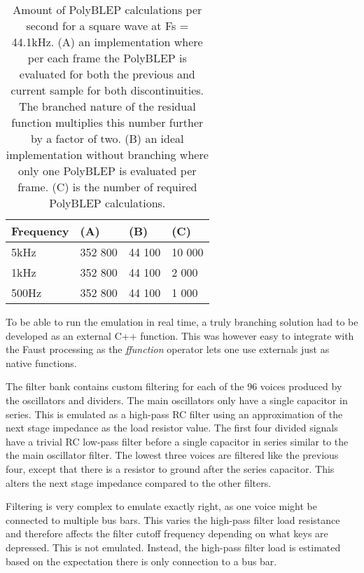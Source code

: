 \documentclass[11pt,a4paper]{article}
\begin{document}
\begin{table}[h]
 \begin{center}
\begin{tabular}{|l|l|l|l|}

      \hline
      Frequency & (A)        &  (B)         & (C) \\
      \hline\hline
      5kHz     & 352 800     & 44 100       & 10 000\\
      1kHz     & 352 800     & 44 100       &  2 000\\
      500Hz    & 352 800     & 44 100       &  1 000\\
      \hline

\end{tabular}
\caption{Amount of PolyBLEP calculations per second for a square wave at Fs = 44.1kHz. 
(A) an implementation where per each frame the PolyBLEP is evaluated for both the previous and current sample for both discontinuities. The branched nature of the residual function multiplies this number further by a factor of two.
(B) an ideal implementation without branching where only one PolyBLEP is evaluated per frame.
(C) is the number of required PolyBLEP calculations.  }\label{table:polyblep-amount}
 \end{center}
\end{table}

To be able to run the emulation in real time, a truly branching solution had to be developed as an external C++ function. This was however easy to integrate with the Faust processing as the \emph{ffunction} operator lets one use externals just as native functions.

The filter bank contains custom filtering for each of the 96 voices produced by the oscillators and dividers. The main oscillators only have a single capacitor in series. This is emulated as a high-pass RC filter using an approximation of the next stage impedance as the load resistor value. The first four divided signals have a trivial RC low-pass filter before a single capacitor in series similar to the the main oscillator filter. The lowest three voices are filtered like the previous four, except that there is a resistor to ground after the series capacitor. This alters the next stage impedance compared to the other filters.

Filtering is very complex to emulate exactly right, as one voice might be connected to multiple bus bars. This varies the high-pass filter load resistance and therefore affects the filter cutoff frequency depending on what keys are depressed. This is not emulated. Instead, the high-pass filter load is estimated based on the expectation there is only connection to a bus bar.
\end{document}

